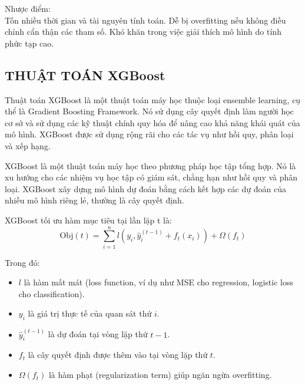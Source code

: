\documentclass[conference]{IEEEtran}
\begin{document}
       Nhược điểm:\\
       Tốn nhiều thời gian và tài nguyên tính toán.
       Dễ bị overfitting nếu không điều chỉnh cẩn thận các tham số.
       Khó khăn trong việc giải thích mô hình do tính phức tạp cao.\\

       \subsection{THUẬT TOÁN XGBoost}

       Thuật toán XGBoost là một thuật toán máy học thuộc loại ensemble learning, cụ thể là Gradient Boosting Framework. Nó sử dụng cây quyết định làm người học  cơ sở và sử dụng các kỹ thuật chính quy hóa để nâng cao khả năng khái quát của mô hình. XGBoost được sử dụng rộng rãi cho các tác vụ như hồi quy, phân loại và xếp hạng.
      
       XGBoost là một thuật toán máy học theo phương pháp học tập tổng hợp. Nó là xu hướng cho các nhiệm vụ học tập có giám sát, chẳng hạn như hồi quy và phân loại. XGBoost xây dựng mô hình dự đoán bằng cách kết hợp các dự đoán của nhiều mô hình riêng lẻ, thường là cây quyết định.
      
       XGBoost tối ưu hàm mục tiêu tại lần lặp t là:
      \begin{equation}
      \text{Obj}(t) = \sum_{i=1}^{n} l(y_i, \hat{y}_i^{(t-1)} + f_t(x_i)) + \Omega(f_t)
      \end{equation}
      
      Trong đó:
      \begin{itemize}
          \item \( l \) là hàm mất mát (loss function, ví dụ như MSE cho regression, logistic loss cho classification).
          \item \( y_i \) là giá trị thực tế của quan sát thứ \( i \).
          \item \( \hat{y}_i^{(t-1)} \) là dự đoán tại vòng lặp thứ \( t-1 \).
          \item \( f_t \) là cây quyết định được thêm vào tại vòng lặp thứ \( t \).
          \item \( \Omega(f_t) \) là hàm phạt (regularization term) giúp ngăn ngừa overfitting.
      \end{itemize}
      
\end{document}
